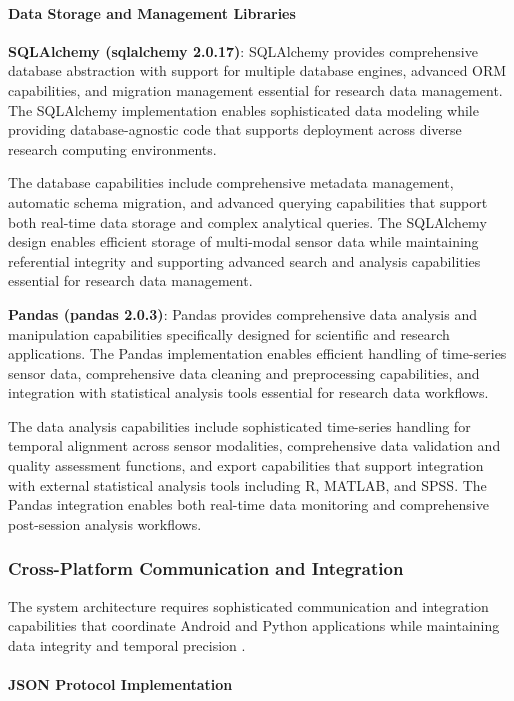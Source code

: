 \documentclass[11pt,a4paper]{report}
\begin{document}
\paragraph{Data Storage and Management Libraries}

\textbf{SQLAlchemy (sqlalchemy 2.0.17)}: SQLAlchemy provides comprehensive database abstraction with support for multiple
database engines, advanced ORM capabilities, and migration management essential for research data management. The
SQLAlchemy implementation enables sophisticated data modeling while providing database-agnostic code that supports
deployment across diverse research computing environments.

The database capabilities include comprehensive metadata management, automatic schema migration, and advanced querying
capabilities that support both real-time data storage and complex analytical queries. The SQLAlchemy design enables
efficient storage of multi-modal sensor data while maintaining referential integrity and supporting advanced search and
analysis capabilities essential for research data management.

\textbf{Pandas (pandas 2.0.3)}: Pandas provides comprehensive data analysis and manipulation capabilities specifically
designed for scientific and research applications. The Pandas implementation enables efficient handling of time-series
sensor data, comprehensive data cleaning and preprocessing capabilities, and integration with statistical analysis tools
essential for research data workflows.

The data analysis capabilities include sophisticated time-series handling for temporal alignment across sensor
modalities, comprehensive data validation and quality assessment functions, and export capabilities that support
integration with external statistical analysis tools including R, MATLAB, and SPSS. The Pandas integration enables both
real-time data monitoring and comprehensive post-session analysis workflows.

\subsubsection{Cross-Platform Communication and Integration}

The system architecture requires sophisticated communication and integration capabilities that coordinate Android and
Python applications while maintaining data integrity and temporal precision .

\paragraph{JSON Protocol Implementation}
\end{document}
